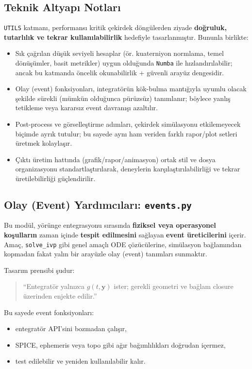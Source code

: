 \subsection*{Teknik Altyapı Notları}
\texttt{UTILS} katmanı, performansı kritik çekirdek döngülerden ziyade
\textbf{doğruluk, tutarlılık ve tekrar kullanılabilirlik} hedefiyle tasarlanmıştır.
Bununla birlikte:
\begin{itemize}
    \item Sık çağrılan düşük seviyeli hesaplar (ör. kuaterniyon normlama, temel dönüşümler, basit metrikler)
    uygun olduğunda \texttt{Numba} ile hızlandırılabilir; ancak bu katmanda öncelik
    okunabilirlik + güvenli arayüz dengesidir.
    \item Olay (event) fonksiyonları, integratörün kök-bulma mantığıyla uyumlu olacak şekilde
    sürekli (mümkün olduğunca pürüzsüz) tanımlanır; böylece yanlış tetikleme veya kararsız event davranışı azaltılır.
    \item Post-process ve görselleştirme adımları, çekirdek simülasyonu etkilemeyecek biçimde
    ayrık tutulur; bu sayede aynı ham veriden farklı rapor/plot setleri üretmek kolaylaşır.
    \item Çıktı üretim hattında (grafik/rapor/animasyon) ortak stil ve dosya organizasyonu
    standartlaştırılarak, deneylerin karşılaştırılabilirliği ve tekrar üretilebilirliği güçlendirilir.
\end{itemize}


\newpage
\subsection{Olay (Event) Yardımcıları: \texttt{events.py}}
\label{subsec:events}

Bu modül, yörünge entegrasyonu sırasında \textbf{fiziksel veya operasyonel koşulların} zaman içinde \textbf{tespit edilmesini} sağlayan \textbf{event üreticilerini} içerir. Amaç, \texttt{solve\_ivp} gibi genel amaçlı ODE çözücülerine,
simülasyon bağlamından kopmadan fakat yalın bir arayüzle
olay (event) tanımları sunmaktır.

Tasarım prensibi şudur:
\begin{quote}
“Entegratör yalnızca \(g(t,\mathbf{y})\) ister; gerekli geometri ve bağlam closure üzerinden enjekte edilir.”
\end{quote}

Bu sayede event fonksiyonları:
\begin{itemize}
  \item entegratör API’sini bozmadan çalışır,
  \item SPICE, ephemeris veya topo gibi ağır bağımlılıkları doğrudan içermez,
  \item test edilebilir ve yeniden kullanılabilir kalır.
\end{itemize}

